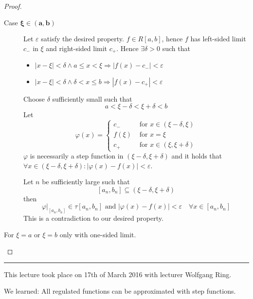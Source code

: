 \documentclass[a4paper,landscape,twocolumn]{article}
\theoremstyle{definition}
\newcommand\abs[1]{\left|#1\right|}
\newcommand\meta[3]{\hrule{} This #1 took place on #2 with lecturer #3.\par}
\begin{document}
\begin{proof}
\begin{description}
\begin{description}
        \begin{description}
          \item[Case $\mathbf{\xi \in (a,b)}$]
            Let $\varepsilon$ satisfy the desired property.
            $f \in R[a,b]$, hence $f$ has left-sided limit $c_-$ in $\xi$
            and right-sided limit $c_+$. Hence $\exists \delta > 0$ such that
            \begin{itemize}
              \item $\abs{x - \xi} < \delta \land a \leq x < \xi
              \Rightarrow \abs{f(x) - c_-} < \varepsilon$
              \item $\abs{x - \xi} < \delta \land \delta < x \leq b
              \Rightarrow \abs{f(x) - c_+} < \varepsilon$
            \end{itemize}
            Choose $\delta$ sufficiently small such that
            \[ a < \xi - \delta < \xi + \delta < b \]
            Let
            \[
              \varphi(x) = \begin{cases}
                c_- & \text{ for } x \in (\xi - \delta, \xi) \\
                f(\xi) & \text{ for } x = \xi \\
                c_+ & \text{ for } x \in (\xi, \xi + \delta)
              \end{cases}
            \]
            $\varphi$ is necessarily a step function in $(\xi - \delta, \xi + \delta)$
            and it holds that $\forall x \in (\xi - \delta, \xi + \delta):
            \abs{\varphi(x) - f(x)} < \varepsilon$.

            Let $n$ be sufficiently large such that
            \[ [a_n,b_n] \subseteq (\xi - \delta, \xi + \delta) \]
            then
            \[
              \varphi|_{[a_n,b_n]} \in \tau[a_n,b_n]
              \text{ and }
              \abs{\varphi(x) - f(x)} < \varepsilon \quad \forall x \in [a_n,b_n]
            \]
            This is a contradiction to our desired property.
        \end{description}

        For $\xi = a$ or $\xi = b$ only with one-sided limit.
      \end{description}
  \end{description}
\end{proof}

\meta{lecture}{17th of March 2016}{Wolfgang Ring}

We learned: All regulated functions can be approximated with step functions.
\end{document}
